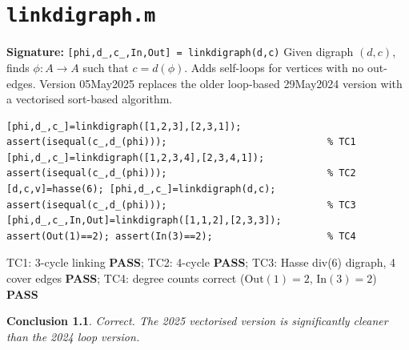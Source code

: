 \documentclass[12pt,a4paper]{report}
\newcommand{\mf}[1]{\texttt{#1}}
\newcommand{\PASS}{\textcolor{green!60!black}{\textbf{PASS}}}
\newtheorem{concl}{Conclusion}[chapter]
\begin{document}
\chapter{\mf{linkdigraph.m}}
\begin{tcolorbox}[Abox,title=Analysis]
\textbf{Signature:} \lstinline|[phi,d_,c_,In,Out] = linkdigraph(d,c)|\quad
Given digraph $(d,c)$, finds $\phi:A\to A$ such that $c=d(\phi)$. Adds self-loops for vertices with no out-edges. Version 05May2025 replaces the older loop-based 29May2024 version with a vectorised sort-based algorithm.
\end{tcolorbox}
\begin{lstlisting}[caption={Tests for linkdigraph.m}]
[phi,d_,c_]=linkdigraph([1,2,3],[2,3,1]);
assert(isequal(c_,d_(phi)));                            % TC1
[phi,d_,c_]=linkdigraph([1,2,3,4],[2,3,4,1]);
assert(isequal(c_,d_(phi)));                            % TC2
[d,c,v]=hasse(6); [phi,d_,c_]=linkdigraph(d,c);
assert(isequal(c_,d_(phi)));                            % TC3
[phi,d_,c_,In,Out]=linkdigraph([1,1,2],[2,3,3]);
assert(Out(1)==2); assert(In(3)==2);                    % TC4
\end{lstlisting}
\begin{tcolorbox}[Pbox,title=TC1--TC4 -- All pass]
TC1: 3-cycle linking \PASS; TC2: 4-cycle \PASS; TC3: Hasse div(6) digraph, 4 cover edges \PASS; TC4: degree counts correct ($\mathrm{Out}(1)=2$, $\mathrm{In}(3)=2$) \PASS
\end{tcolorbox}
\begin{concl}
Correct. The 2025 vectorised version is significantly cleaner than the 2024 loop version.
\end{concl}

\end{document}
